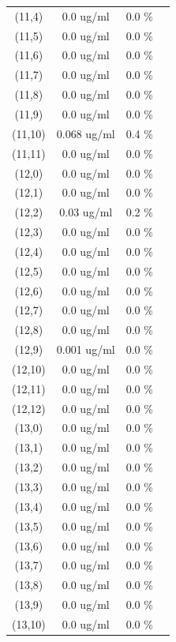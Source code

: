 \documentclass{article}
\begin{document}
\begin{tabular}{c c c c}
(11,4)&        0.0 ug/ml        &0.0 \%\\
(11,5)&        0.0 ug/ml        &0.0 \%\\
(11,6)&        0.0 ug/ml        &0.0 \%\\
(11,7)&        0.0 ug/ml        &0.0 \%\\
(11,8)&        0.0 ug/ml        &0.0 \%\\
(11,9)&        0.0 ug/ml        &0.0 \%\\
(11,10)&        0.068 ug/ml        &0.4 \%\\
(11,11)&        0.0 ug/ml        &0.0 \%\\
(12,0)&        0.0 ug/ml        &0.0 \%\\
(12,1)&        0.0 ug/ml        &0.0 \%\\
(12,2)&        0.03 ug/ml        &0.2 \%\\
(12,3)&        0.0 ug/ml        &0.0 \%\\
(12,4)&        0.0 ug/ml        &0.0 \%\\
(12,5)&        0.0 ug/ml        &0.0 \%\\
(12,6)&        0.0 ug/ml        &0.0 \%\\
(12,7)&        0.0 ug/ml        &0.0 \%\\
(12,8)&        0.0 ug/ml        &0.0 \%\\
(12,9)&        0.001 ug/ml        &0.0 \%\\
(12,10)&        0.0 ug/ml        &0.0 \%\\
(12,11)&        0.0 ug/ml        &0.0 \%\\
(12,12)&        0.0 ug/ml        &0.0 \%\\
(13,0)&        0.0 ug/ml        &0.0 \%\\
(13,1)&        0.0 ug/ml        &0.0 \%\\
(13,2)&        0.0 ug/ml        &0.0 \%\\
(13,3)&        0.0 ug/ml        &0.0 \%\\
(13,4)&        0.0 ug/ml        &0.0 \%\\
(13,5)&        0.0 ug/ml        &0.0 \%\\
(13,6)&        0.0 ug/ml        &0.0 \%\\
(13,7)&        0.0 ug/ml        &0.0 \%\\
(13,8)&        0.0 ug/ml        &0.0 \%\\
(13,9)&        0.0 ug/ml        &0.0 \%\\
(13,10)&        0.0 ug/ml        &0.0 \%\\

\end{tabular}
\end{document}
